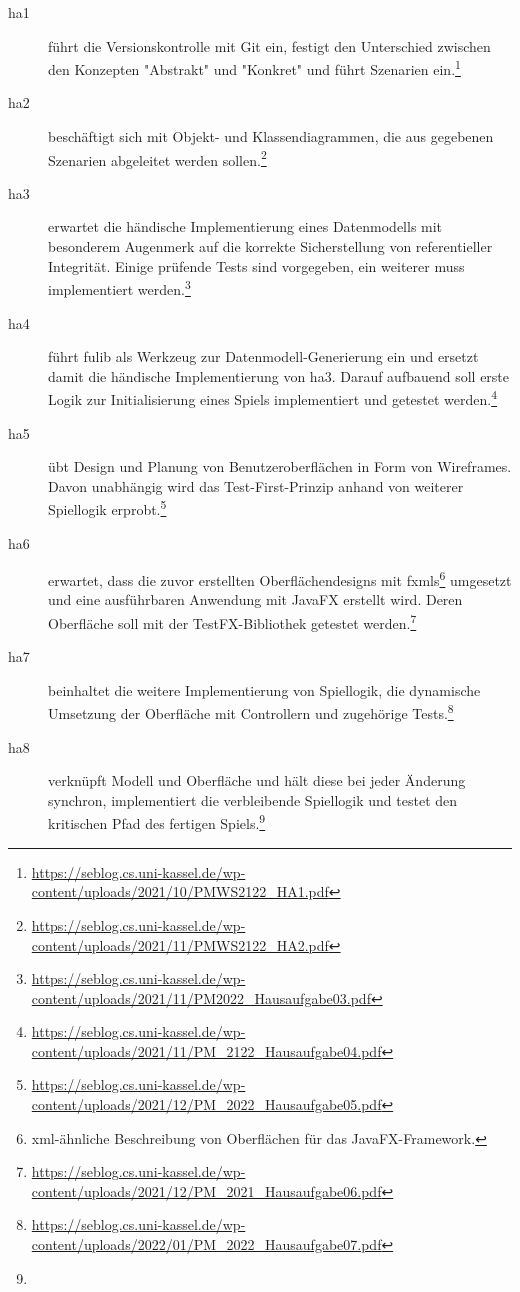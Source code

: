 \begin{description}
    \item[\ac{ha}1] führt die Versionskontrolle mit Git ein, festigt den Unterschied zwischen den Konzepten "Abstrakt" und "Konkret" und führt Szenarien ein.\footnote{
        \url{https://seblog.cs.uni-kassel.de/wp-content/uploads/2021/10/PMWS2122_HA1.pdf}
    }
    \item[\ac{ha}2] beschäftigt sich mit Objekt- und Klassendiagrammen, die aus gegebenen Szenarien abgeleitet werden sollen.\footnote{
        \url{https://seblog.cs.uni-kassel.de/wp-content/uploads/2021/11/PMWS2122_HA2.pdf}
    }
    \item[\ac{ha}3] erwartet die händische Implementierung eines Datenmodells mit besonderem Augenmerk auf die korrekte Sicherstellung von referentieller Integrität.
    Einige prüfende Tests sind vorgegeben, ein weiterer muss implementiert werden.\footnote{
        \url{https://seblog.cs.uni-kassel.de/wp-content/uploads/2021/11/PM2022_Hausaufgabe03.pdf}
    }
    \item[\ac{ha}4] führt fulib als Werkzeug zur Datenmodell-Generierung ein und ersetzt damit die händische Implementierung von \ac{ha}3.
    Darauf aufbauend soll erste Logik zur Initialisierung eines Spiels implementiert und getestet werden.\footnote{
        \url{https://seblog.cs.uni-kassel.de/wp-content/uploads/2021/11/PM_2122_Hausaufgabe04.pdf}
    }
    \item[\ac{ha}5] übt Design und Planung von Benutzeroberflächen in Form von Wireframes.
    Davon unabhängig wird das Test-First-Prinzip anhand von weiterer Spiellogik erprobt.\footnote{
        \url{https://seblog.cs.uni-kassel.de/wp-content/uploads/2021/12/PM_2022_Hausaufgabe05.pdf}
    }
    \item[\ac{ha}6] erwartet, dass die zuvor erstellten Oberflächendesigns mit \acp{fxml}\footnote{
        \ac{xml}-ähnliche Beschreibung von Oberflächen für das JavaFX-Framework.
    } umgesetzt und eine ausführbaren Anwendung mit JavaFX erstellt wird.
    Deren Oberfläche soll mit der TestFX-Bibliothek getestet werden.\footnote{
        \url{https://seblog.cs.uni-kassel.de/wp-content/uploads/2021/12/PM_2021_Hausaufgabe06.pdf}
    }
    \item[\ac{ha}7] beinhaltet die weitere Implementierung von Spiellogik, die dynamische Umsetzung der Oberfläche mit Controllern und zugehörige Tests.\footnote{
        \url{https://seblog.cs.uni-kassel.de/wp-content/uploads/2022/01/PM_2022_Hausaufgabe07.pdf}
    }
    \item[\ac{ha}8] verknüpft Modell und Oberfläche und hält diese bei jeder Änderung synchron, implementiert die verbleibende Spiellogik und testet den kritischen Pfad des fertigen Spiels.\footnote{
}
\end{description}
